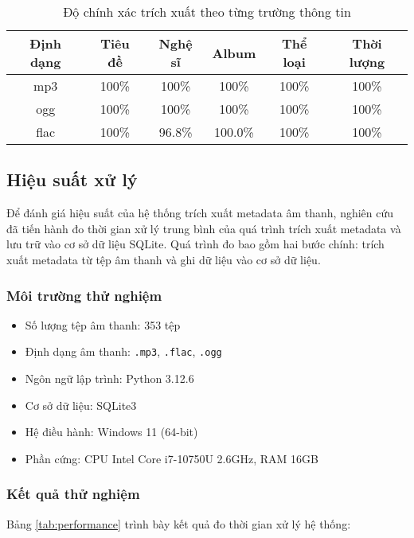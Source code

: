 \documentclass[conference]{IEEEtran}
\begin{document}
\begin{table}[H]
    \centering
    \caption{Độ chính xác trích xuất theo từng trường thông tin}
    \begin{tabular}{|c|c|c|c|c|c|}
    \hline
    \textbf{Định dạng} & \textbf{Tiêu đề} & \textbf{Nghệ sĩ} & \textbf{Album} & \textbf{Thể loại} & \textbf{Thời lượng} \\
    \hline
    mp3 & 100\% & 100\% & 100\% & 100\% & 100\% \\
    ogg & 100\% & 100\% & 100\% & 100\% & 100\% \\
    flac & 100\% & 96.8\% & 100.0\% & 100\% & 100\% \\
    \hline
    \end{tabular}
\end{table}

\subsection{Hiệu suất xử lý}

Để đánh giá hiệu suất của hệ thống trích xuất metadata âm thanh, nghiên cứu đã tiến hành đo thời gian xử lý trung bình của quá trình trích xuất metadata và lưu trữ vào cơ sở dữ liệu SQLite. Quá trình đo bao gồm hai bước chính: trích xuất metadata từ tệp âm thanh và ghi dữ liệu vào cơ sở dữ liệu.

\subsubsection{Môi trường thử nghiệm}

\begin{itemize}
    \item Số lượng tệp âm thanh: 353 tệp
    \item Định dạng âm thanh: \texttt{.mp3}, \texttt{.flac}, \texttt{.ogg}
    \item Ngôn ngữ lập trình: Python 3.12.6
    \item Cơ sở dữ liệu: SQLite3
    \item Hệ điều hành: Windows 11 (64-bit)
    \item Phần cứng: CPU Intel Core i7-10750U 2.6GHz, RAM 16GB
\end{itemize}

\subsubsection{Kết quả thử nghiệm}

Bảng \ref{tab:performance} trình bày kết quả đo thời gian xử lý hệ thống:
\end{document}
